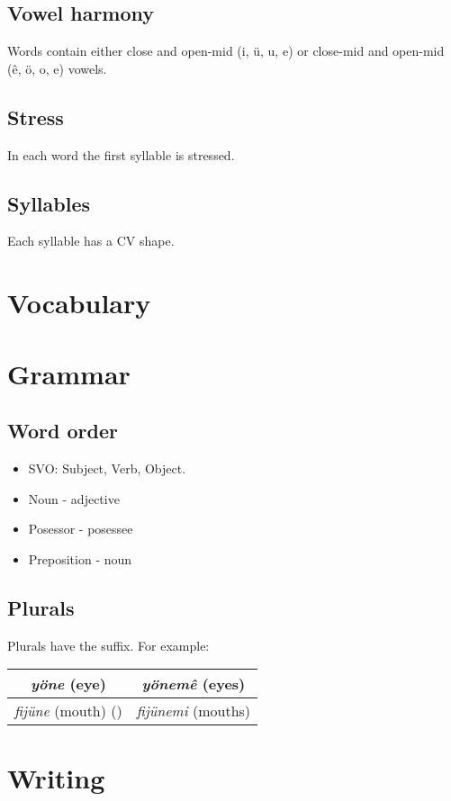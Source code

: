 \documentclass[a4paper]{article}
\begin{document}
\subsection{Vowel harmony}

Words contain either close and open-mid (i, \"u, u, e) or close-mid and
open-mid (\^e, \"o, o, e) vowels.

\subsection{Stress}

In each word the first syllable is stressed.

\subsection{Syllables}

Each syllable has a CV shape.

\section{Vocabulary}

\section{Grammar}

\subsection{Word order}

\begin{itemize}
\item SVO: Subject, Verb, Object.
\item Noun - adjective
\item Posessor - posessee
\item Preposition - noun
\end{itemize}

\subsection{Plurals}

Plurals have the  suffix. For example:
\begin{tabular}{c | c}
\emph{y\"one} (eye) & \emph{y\"onem\^e} (eyes) \\
\hline
\emph{fij\"une} (mouth) () & \emph{fij\"unemi} (mouths)
\end{tabular}

\section{Writing}
\end{document}
